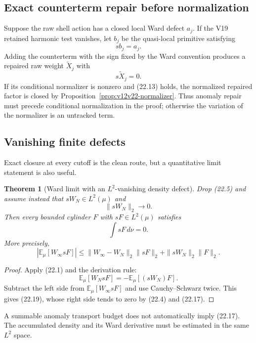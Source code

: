 \documentclass[11pt]{article}
\newtheorem{theorem}{Theorem}[section]
\theoremstyle{remark}
\begin{document}
\subsection{Exact counterterm repair before normalization}

Suppose the raw shell action has a closed local Ward defect
\(a_j\).  If the V19 retained harmonic test vanishes, let \(b_j\) be
the quasi-local primitive satisfying
\[
                         s b_j=a_j.                         \tag{22.15}
\]
Adding the counterterm with the sign fixed by the Ward convention
produces a repaired raw weight \(\widetilde X_j\) with
\[
                         s\widetilde X_j=0.                 \tag{22.16}
\]
If its conditional normalizer is nonzero and (22.13) holds, the
normalized repaired factor is closed by
Proposition~\ref{prop:v12v22-normalizer}.  Thus anomaly repair must
precede conditional normalization in the proof; otherwise the
variation of the normalizer is an untracked term.

\subsection{Vanishing finite defects}

Exact closure at every cutoff is the clean route, but a quantitative
limit statement is also useful.

\begin{theorem}[Ward limit with an \(L^2\)-vanishing density defect]
\label{thm:v12v22-defect}
Drop (22.5) and assume instead that \(sW_N\in L^2(\mu)\) and
\[
                         \|sW_N\|_2\longrightarrow0.        \tag{22.17}
\]
Then every bounded cylinder \(F\) with \(sF\in L^2(\mu)\) satisfies
\[
                         \int sF\,d\nu=0.                   \tag{22.18}
\]
More precisely,
\[
 \left|
 {\mathbb E}_\mu[W_\infty sF]
 \right|
 \le
 \|W_\infty-W_N\|_2\|sF\|_2
 +\|sW_N\|_2\|F\|_2.                                      \tag{22.19}
\]
\end{theorem}

\begin{proof}
Apply (22.1) and the derivation rule:
\[
 {\mathbb E}_\mu[W_NsF]
 =-{\mathbb E}_\mu[(sW_N)F].                               \tag{22.20}
\]
Subtract the left side from
\({\mathbb E}_\mu[W_\infty sF]\) and use Cauchy--Schwarz twice.
This gives (22.19), whose right side tends to zero by (22.4) and
(22.17).
\end{proof}

A summable anomaly transport budget does not automatically imply
(22.17).  The accumulated density and its Ward derivative must be
estimated in the same \(L^2\) space.
\end{document}

